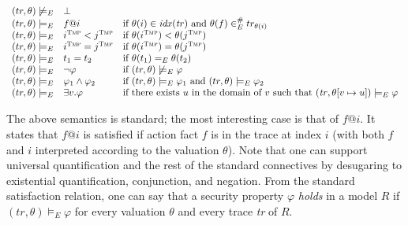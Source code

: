 \documentclass{article}
\theoremstyle{definition}
\begin{document}
$
\begin{array}{cll}
   (tr, \theta) \not\models_E  & \bot &  \\
   (tr, \theta) \models_E  & f@i & \text{if } \theta(i) \in \mathit{idx}(\mathit{tr}) \text{ and } \theta(f) \in^\#_E tr_{\theta(i)} \\
   (tr, \theta) \models_E  & i^\textsc{Tmp} < j^\textsc{Tmp} & \text{if } \theta(i^\textsc{Tmp}) < \theta(j^\textsc{Tmp}) \\
   (tr, \theta) \models_E  & i^\textsc{Tmp} = j^\textsc{Tmp} & \text{if }\theta(i^\textsc{Tmp}) = \theta(j^\textsc{Tmp}) \\
   (tr, \theta) \models_E  & t_1 = t_2 &\text{if } \theta(t_1) =_E \theta(t_2) \\
   (tr, \theta) \models_E  & \neg \varphi & \text{if }(tr, \theta) \not\models_E \varphi \\
   (tr, \theta) \models_E  & \varphi_1 \land \varphi_2 & \text{if }(tr, \theta) \models_E \varphi_1 \text{ and }(tr, \theta) \models_E \varphi_2 \\
   (tr, \theta) \models_E  & \exists v. \varphi & \text{if there exists }u\text{ in the domain of  } v \text{ such that } (\mathit{tr}, \theta[v \mapsto u]) \models_E \varphi \\
\end{array}
$

The above semantics is standard; the most interesting case is that of $f@i$. It states that $f@i$ is satisfied if action fact $f$ is in the trace at index $i$ (with both $f$ and $i$ interpreted according to the valuation $\theta$). Note that one can support universal quantification and the rest of the standard connectives by desugaring to existential quantification, conjunction, and negation. From the standard satisfaction relation, one can say that a security property $\varphi$ \emph{holds} in a model $R$ if $(\mathit{tr}, \theta) \models_E \varphi$ for every valuation $\theta$ and every trace \emph{tr} of $R$.
\end{document}
